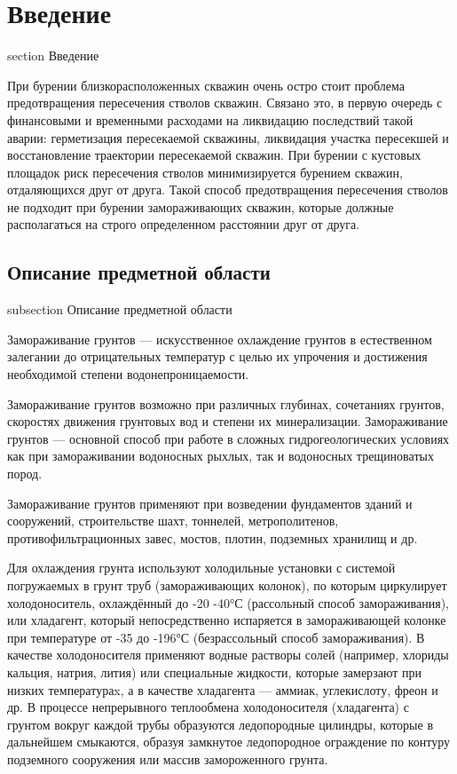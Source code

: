 \newpage
\section*{Введение}
 {section} {Введение}

При бурении близкорасположенных скважин очень остро стоит проблема предотвращения пересечения стволов скважин. Связано это, в первую очередь с финансовыми и временными
расходами на ликвидацию последствий такой аварии: герметизация пересекаемой скважины, ликвидация участка пересекшей и восстановление траектории пересекаемой скважин.
При бурении с кустовых площадок риск пересечения стволов минимизируется бурением скважин, отдаляющихся друг от друга.
Такой способ предотвращения пересечения стволов не подходит при бурении замораживающих скважин, которые должные располагаться на строго определенном расстоянии
друг от друга.


\subsection*{Описание предметной области}
 {subsection} {Описание предметной области}

Замораживание грунтов — искусственное охлаждение грунтов в естественном залегании до отрицательных температур с целью их упрочения и достижения необходимой степени водонепроницаемости.

Замораживание грунтов возможно при различных глубинах, сочетаниях грунтов, скоростях движения грунтовых вод и степени их минерализации. Замораживание грунтов —
основной способ при работе в сложных гидрогеологических условиях как при замораживании водоносных рыхлых, так и водоносных трещиноватых пород.

Замораживание грунтов применяют при возведении фундаментов зданий и сооружений, строительстве шахт, тоннелей, метрополитенов, противофильтрационных завес, мостов, плотин, подземных хранилищ и др.

Для охлаждения грунта используют холодильные установки с системой погружаемых в грунт труб (замораживающих колонок), по которым циркулирует холодоноситель,
охлаждённый до -20 -40°С (рассольный способ замораживания), или хладагент, который непосредственно испаряется в замораживающей колонке при температуре от -35 до -196°С
(безрассольный способ замораживания). В качестве холодоносителя применяют водные растворы солей (например, хлориды кальция, натрия, лития) или специальные жидкости,
которые замерзают при низких температураx, а в качестве хладагента — аммиак, углекислоту, фреон и др. В процессе непрерывного теплообмена холодоносителя (хладагента)
с грунтом вокруг каждой трубы образуются ледопородные цилиндры, которые в дальнейшем смыкаются, образуя замкнутое ледопородное ограждение по контуру подземного сооружения
или массив замороженного грунта.

